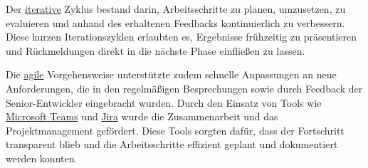 Der \hyperlink{iterativ}{\textcolor{AOBlau}{iterative}} Zyklus bestand darin, Arbeitsschritte zu planen, umzusetzen, zu evaluieren und anhand des erhaltenen Feedbacks kontinuierlich zu verbessern. Diese kurzen Iterationszyklen erlaubten es, Ergebnisse frühzeitig zu präsentieren und Rückmeldungen direkt in die nächste Phase einfließen zu lassen. 

Die \hyperlink{agil}{\textcolor{AOBlau}{agile}} Vorgehensweise unterstützte zudem schnelle Anpassungen an neue Anforderungen, die in den regelmäßigen Besprechungen sowie durch Feedback der Senior-Entwickler eingebracht wurden. Durch den Einsatz von Tools wie \hyperlink{MicrosoftTeams}{\textcolor{AOBlau}{Microsoft Teams}} und \hyperlink{Jira}{\textcolor{AOBlau}{Jira}} wurde die Zusammenarbeit und das Projektmanagement gefördert. Diese Tools sorgten dafür, dass der Fortschritt transparent blieb und die Arbeitsschritte effizient geplant und dokumentiert werden konnten.
